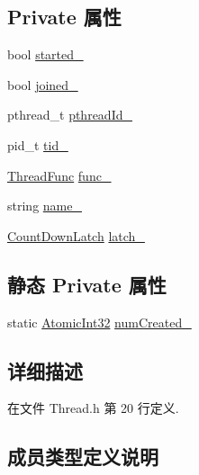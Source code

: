\subsection*{Private 属性}
\begin{DoxyCompactItemize}
\item 
bool \hyperlink{classmuduo_1_1Thread_a5ad69cfc4163d7797bc0f0d7eadb95a7}{started\+\_\+}
\item 
bool \hyperlink{classmuduo_1_1Thread_a6abe498e0c9cb2cc340db85c691527fb}{joined\+\_\+}
\item 
pthread\+\_\+t \hyperlink{classmuduo_1_1Thread_a1cddcc9b885ebd90a657e65ef5386e45}{pthread\+Id\+\_\+}
\item 
pid\+\_\+t \hyperlink{classmuduo_1_1Thread_ad3941d2816d56fc00acc575589d1bf4d}{tid\+\_\+}
\item 
\hyperlink{classmuduo_1_1Thread_a72bd31ac00c06074792e7cff0c8e3022}{Thread\+Func} \hyperlink{classmuduo_1_1Thread_a8d48c0bb2a39f7e2f47bcdb994b1ffa5}{func\+\_\+}
\item 
string \hyperlink{classmuduo_1_1Thread_a79cfd788b219a7f48068d0e96e5e8e77}{name\+\_\+}
\item 
\hyperlink{classmuduo_1_1CountDownLatch}{Count\+Down\+Latch} \hyperlink{classmuduo_1_1Thread_a192dc9b859fde65e1f303e900e00d12a}{latch\+\_\+}
\end{DoxyCompactItemize}
\subsection*{静态 Private 属性}
\begin{DoxyCompactItemize}
\item 
static \hyperlink{namespacemuduo_a5ff4a046f03836ad4fb080652d419987}{Atomic\+Int32} \hyperlink{classmuduo_1_1Thread_a2742b202c5dc4f5f9e2c60798b7ada26}{num\+Created\+\_\+}
\end{DoxyCompactItemize}


\subsection{详细描述}


在文件 Thread.\+h 第 20 行定义.



\subsection{成员类型定义说明}
\mbox{\label{classmuduo_1_1Thread_a72bd31ac00c06074792e7cff0c8e3022}} 
